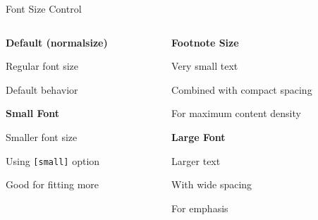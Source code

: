 \documentclass[11pt,compress,t,notes=noshow, xcolor=table]{beamer}
\begin{document}
\begin{frame}{Font Size Control}
  \begin{columns}[T]
    \begin{column}{0.48\textwidth}
      \textbf{Default (normalsize)}
      \begin{itemizeM}
        \item Regular font size
        \item Default behavior
      \end{itemizeM}
      
      \vspace{0.5cm}
      \textbf{Small Font}
      \begin{itemizeM}[small]
        \item Smaller font size
        \item Using \texttt{[small]} option
        \item Good for fitting more
      \end{itemizeM}
    \end{column}
    
    \begin{column}{0.48\textwidth}
      \textbf{Footnote Size}
      \begin{itemizeS}[footnotesize]
        \item Very small text
        \item Combined with compact spacing
        \item For maximum content density
      \end{itemizeS}
      
      \vspace{0.5cm}
      \textbf{Large Font}
      \begin{itemizeL}[large]
        \item Larger text
        \item With wide spacing
        \item For emphasis
      \end{itemizeL}
    \end{column}
  \end{columns}
\end{frame}

\end{document}
